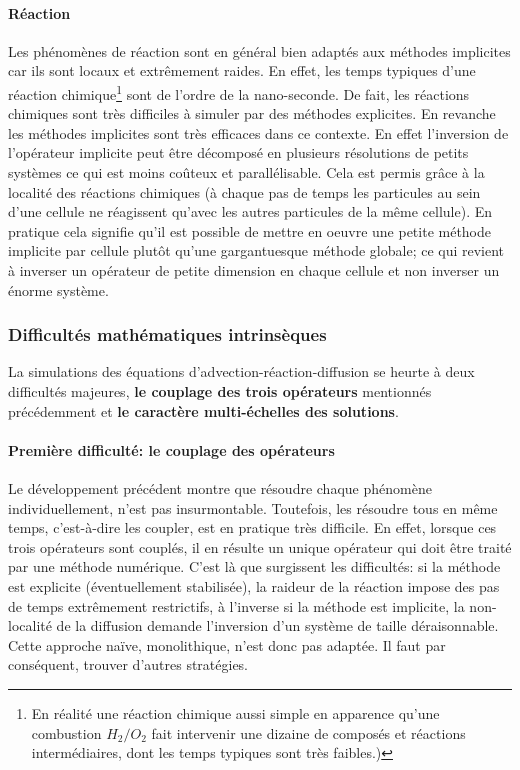 \paragraph{Réaction}
    Les phénomènes de réaction sont en général bien adaptés aux méthodes implicites car ils sont locaux et extrêmement raides.
    En effet, les temps typiques d'une réaction chimique\footnote{
    En réalité une réaction chimique aussi simple en apparence qu'une combustion $H_2/O_2$ fait intervenir une dizaine de composés et réactions intermédiaires, dont les temps typiques sont très faibles.)} sont de l'ordre de la nano-seconde.
    De fait, les réactions chimiques sont très difficiles à simuler par des méthodes explicites.
    En revanche les méthodes implicites sont très efficaces dans ce contexte. En effet l'inversion de l'opérateur implicite 
    peut être décomposé en plusieurs résolutions de petits systèmes ce qui est moins coûteux et parallélisable. Cela est permis grâce à la localité des réactions chimiques
    (à chaque pas de temps les particules au sein d'une cellule ne réagissent qu'avec les autres particules de la même cellule).
    En pratique cela signifie qu'il est possible de mettre en oeuvre une petite méthode implicite par cellule plutôt qu'une gargantuesque méthode globale; 
    ce qui revient à inverser un opérateur de petite dimension en chaque cellule et non inverser un énorme système.

\subsubsection{Difficultés mathématiques intrinsèques}
    La simulations des équations d'advection-réaction-diffusion se heurte à deux difficultés majeures, \textbf{le couplage des trois opérateurs} mentionnés précédemment
    et \textbf{le caractère multi-échelles des solutions}.

    \paragraph{Première difficulté: le couplage des opérateurs}
        Le développement précédent montre que résoudre chaque phénomène individuellement, n'est pas insurmontable. 
        Toutefois, les résoudre tous en même temps, c'est-à-dire les coupler, est en pratique très difficile.
        En effet, lorsque ces trois opérateurs sont couplés, il en résulte un unique opérateur qui doit être traité par une méthode numérique.
        C'est là que surgissent les difficultés: si la méthode est explicite (éventuellement stabilisée), la raideur de la réaction impose des pas de temps extrêmement restrictifs,
        à l'inverse si la méthode est implicite, la non-localité de la diffusion demande l'inversion d'un système de taille déraisonnable. 
        Cette approche naïve, monolithique, n'est donc pas adaptée. Il faut par conséquent, trouver d'autres stratégies.

